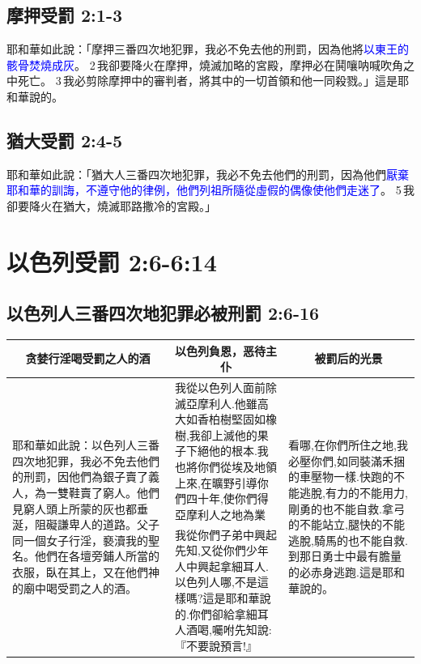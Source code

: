 \subsection{摩押受罰 2:1-3}
耶和華如此說：「摩押三番四次地犯罪，我必不免去他的刑罰，因為他將\textcolor{blue}{以東王的骸骨焚燒成灰}。 2 我卻要降火在摩押，燒滅加略的宮殿，摩押必在鬨嚷呐喊吹角之中死亡。 3 我必剪除摩押中的審判者，將其中的一切首領和他一同殺戮。」這是耶和華說的。

\subsection{猶大受罰 2:4-5}
耶和華如此說：「猶大人三番四次地犯罪，我必不免去他們的刑罰，因為他們\textcolor{blue}{厭棄耶和華的訓誨，不遵守他的律例，他們列祖所隨從虛假的偶像使他們走迷了}。 5 我卻要降火在猶大，燒滅耶路撒冷的宮殿。」

\section{以色列受罰 2:6-6:14}
\subsection{以色列人三番四次地犯罪必被刑罰 2:6-16}
\begin{table}[H]
\centering
\begin{tabular}{p{5.5cm}|p{7.0cm}|p{4.250cm}}\hline\hline
\multicolumn{1}{c|}{贪婪行淫喝受罰之人的酒}&\multicolumn{1}{c|}{以色列負恩，恶待主仆}&\multicolumn{1}{c}{被罰后的光景}\\\hline
\multirow{2}{5.7cm}{耶和華如此說：以色列人三番四次地犯罪，我必不免去他們的刑罰，因他們為銀子賣了義人，為一雙鞋賣了窮人。他們見窮人頭上所蒙的灰也都垂涎，阻礙謙卑人的道路。父子同一個女子行淫，褻瀆我的聖名。他們在各壇旁鋪人所當的衣服，臥在其上，又在他們神的廟中喝受罰之人的酒。}
&我從以色列人面前除滅亞摩利人.他雖高大如香柏樹堅固如橡樹,我卻上滅他的果子下絕他的根本.我也將你們從埃及地領上來,在曠野引導你們四十年,使你們得亞摩利人之地為業
&\multirow{2}{4.55cm}{看哪,在你們所住之地,我必壓你們,如同裝滿禾捆的車壓物一樣.快跑的不能逃脫,有力的不能用力,剛勇的也不能自救.拿弓的不能站立,腿快的不能逃脫,騎馬的也不能自救.到那日勇士中最有膽量的必赤身逃跑.這是耶和華說的。}\\\cline{2-2}
&我從你們子弟中興起先知,又從你們少年人中興起拿細耳人.以色列人哪,不是這樣嗎?這是耶和華說的.你們卻給拿細耳人酒喝,囑咐先知說:『不要說預言!』&\\\hline
\end{tabular}
\end{table}
 


